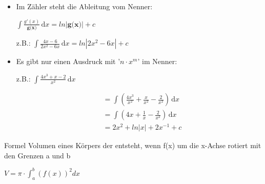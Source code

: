 \documentclass[paper=a6,landscape,ngerman,twoside=true,fontsize=12pt]{scrartcl}
\begin{document}
\begin{antwort}
\normalsize\begin{itemize}
	\item Im Zähler steht die Ableitung vom Nenner:
	
	$\displaystyle\int \! \frac{g'(x)}{\textbf{g(x)}} \, \mathrm{d}x=ln|\textbf{g(x)}|+c$
	
	z.B.: $\displaystyle\int \! \frac{4x-6}{{2x^2-6x}} \, \mathrm{d}x=ln|{2x^2-6x}|+c$
	\item Es gibt nur einen Ausdruck mit '$n \cdot x^m$' im Nenner:
	
	 z.B.: $\displaystyle\int \! \frac{4x^3+x-2}{{x^2}} \, \mathrm{d}x$
	 
	 \begin{align*}
	 &=\displaystyle\int \! (\frac{4x^3}{{x^2}}+\frac{x}{{x^2}}-\frac{2}{{x^2}}) \, \mathrm{d}x \\
	 &=\displaystyle\int \! (4x+\frac{1}{{x}}-\frac{2}{{x^2}}) \, \mathrm{d}x \\
	 &=\displaystyle 2x^2+ln|x|+2x^{-1}+c
	 \end{align*}
	\end{itemize}
\end{antwort}
\begin{frage}
	Formel Volumen eines Körpers der entsteht, wenn f(x) um die x-Achse rotiert mit den Grenzen a und b
\end{frage}
\begin{antwort}
	\begin{center}
		\huge
		$V = \pi \cdot \int_a^b \left( f(x) \right)^2 dx$
	\end{center}
\end{antwort}
\end{document}
